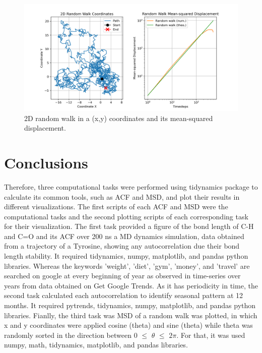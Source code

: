 \documentclass{article}
\begin{document}
\begin{figure}[H]
\centering
\includegraphics[width=\linewidth]{msd_plot.png}
\caption{2D random walk in a (x,y) coordinates and its mean-squared displacement.}
\label{fig:msd_plot}
\end{figure}

\section{Conclusions}

Therefore, three computational tasks were performed using tidynamics package to calculate its common tools, such as ACF and MSD, and plot their results in different visualizations. The first scripts of each ACF and MSD were the computational tasks and the second plotting scripts of each corresponding task for their visualization. The first task provided a figure of the bond length of C-H and C=O and its ACF over 200 ns a MD dynamics simulation, data obtained from a trajectory of a Tyrosine, showing any autocorrelation due their bond length stability. It required tidynamics, numpy, matplotlib, and pandas python libraries. Whereas the keywords 'weight', 'diet', 'gym', 'money', and 'travel' are searched on google at every beginning of year as observed in time-series over years from data obtained on Get Google Trends. As it has periodicity in time, the second task calculated each autocorrelation to identify seasonal pattern at 12 months. It required pytrends, tidynamics, numpy, matplotlib, and pandas python libraries. Fianlly, the third task was MSD of a random walk was plotted, in which x and y coordinates were applied cosine (theta) and sine (theta) while theta was randomly sorted in the direction between 0 $\leq$ $\theta$ $\leq$ $2\pi$. For that, it was used numpy, math, tidynamics, matplotlib, and pandas libraries.



\end{document}
